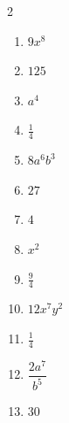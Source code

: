 \documentclass[11pt]{article}
\begin{document}
\begin{keybox}
\begin{multicols}{2}
\small
\begin{enumerate}[leftmargin=*,itemsep=3pt]
  \item $9x^8$
  \item $125$
  \item $a^4$
  \item $\tfrac14$
  \item $8a^6b^3$
  \item $27$
  \item $4$
  \item $x^2$
  \item $\tfrac94$
  \item $12x^7y^2$
  \item $\tfrac14$
  \item $\dfrac{2a^7}{b^5}$
  \item $30$
\end{enumerate}
\end{multicols}
\end{keybox}
\end{document}
